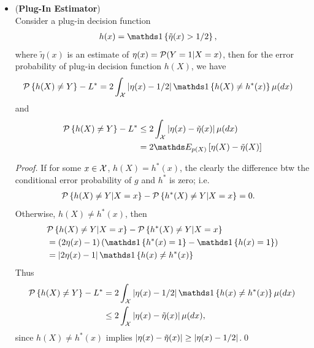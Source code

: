 \documentclass[11pt]{article}
\begin{document}
\begin{itemize}
\item \begin{proposition} \label{prop: plug_in_deviation} (\textbf{Plug-In Estimator}) \citep{devroye2013probabilistic}\\
Consider a plug-in decision function 
\begin{align*}
h(x) &= \ind{\tilde{\eta}(x)>1/2},
\end{align*}
where $\tilde{\eta}(x)$ is an estimate of $\eta(x)= {\mathcal P}(Y=1| X=x)$, then for the error probability of plug-in decision function  $h(X)$, we have
\begin{align}
\cP\set{h(X)\neq Y} - L^{*} &= 2\int_{\cX}\abs{\eta(x)- 1/2}\ind{h(X)\neq h^{*}(x)}\mu(dx) \label{expr: Bayes_excess_plug_in}
\end{align}
and 
\begin{align}
\cP\set{h(X)\neq Y} - L^{*} &\le 2\int_{\cX}\abs{\eta(x)- \tilde{\eta}(x)}\mu(dx) \nonumber\\
& = 2\E{p(X)}{\eta(X)- \tilde{\eta}(X)}  \label{expr: Bayes_excess_plug_in_2}
\end{align}
\end{proposition}
\begin{proof}
If for some $x\in {\mathcal X}$, $h(X)= h^{*}(x)$, the clearly the difference btw the conditional error probability of $g$ and $h^{*}$ is zero; i.e. 
\begin{align*}
{\mathcal P}\left\{h(X)\neq Y| X=x\right\} - {\mathcal P}\left\{h^{*}(X)\neq Y| X=x\right\}  &= 0.
\end{align*}
Otherwise, $h(X)\neq h^{*}(x)$, then 
\begin{align*}
&\cP\set{h(X)\neq Y| X=x} - \cP\set{h^{*}(X)\neq Y| X=x}  \\
&= (2\eta(x)-1)\paren{ \ind{h^{*}(x)=1} -  \ind{h(x)=1}  }\\
&= \abs{2\eta(x)-1}\ind{h(x)\neq h^{*}(x)}
\end{align*}
Thus
\begin{align*}
\cP\set{h(X)\neq Y} - L^{*} &=2 \int_{\cX}\abs{\eta(x)-1/2}\ind{h(x)\neq h^{*}(x)}\mu(dx)\\
&\le 2 \int_{\cX}\abs{\eta(x)- \tilde{\eta}(x)}\mu(dx),
\end{align*}
since $h(X)\neq h^{*}(x)$ implies $\left\lvert \eta(x)- \tilde{\eta}(x) \right\rvert\ge \left\lvert \eta(x)-1/2 \right\rvert$.\qed 
\end{proof}


\end{itemize}
\end{document}
